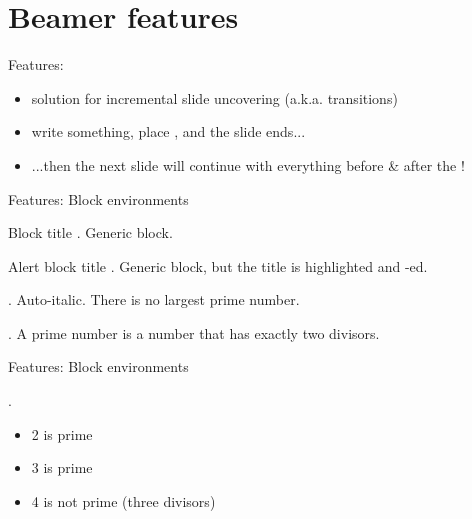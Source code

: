 \section{Beamer features}

\begin{frame}{Features: }
    \begin{itemize}
        \item solution for incremental slide uncovering (a.k.a. transitions)
        \pause
        \item write something, place , and the slide ends...
        \pause
        \item ...then the next slide will continue with everything before \&
            after the !
    \end{itemize}
\end{frame}

\begin{frame}{Features: Block environments}
    \begin{block}{Block title}
        .
        Generic block.
    \end{block}
    \pause
    \begin{alertblock}{Alert block title}
        .
        Generic block, but the title is highlighted and -ed.
    \end{alertblock}
    \pause
    \begin{theorem}
        .
        Auto-italic. There is no largest prime number.
    \end{theorem}
    \pause
    \begin{definition}
        .
        A \alert{prime number} is a number that has exactly two divisors.
    \end{definition}
\end{frame}

\begin{frame}{Features: Block environments}
    \begin{example}
        .
        \begin{itemize}
            \item 2 is prime
            \item 3 is prime
            \item 4 is not prime (\alert{three} divisors)
        \end{itemize}
    \end{example}
\end{frame}
